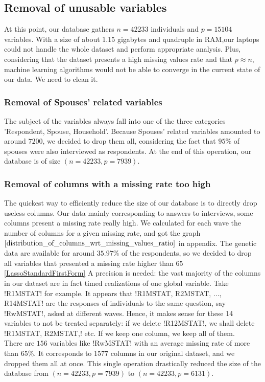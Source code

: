 \documentclass[]{article}
\begin{document}
\subsection{Removal of unusable variables}
\label{removal_of_unusable_variables}
At this point, our database gathers $n=42233$ individuals and $p=15104$ variables. With a size of about $1.15$ gigabytes and quadruple in RAM,our laptops could not handle the whole dataset and perform appropriate analysis. Plus, considering that the dataset presents a high missing values rate and that $p\approx n$, machine learning algorithms would not be able to converge in the current state of our data. We need to clean it.

\subsubsection{Removal of Spouses' related variables}
The subject of the variables always fall into one of the three categories 'Respondent, Spouse, Household'. Because Spouses' related variables amounted to around $7200$, we decided to drop them all, considering the fact that $95$\% of spouses were also interviewed as respondents.
At the end of this operation, our database is of size $(n=42233, p=7939)$.

\subsubsection{Removal of columns with a missing rate too high}
The quickest way to efficiently reduce the size of our database is to directly drop useless columns. Our data mainly corresponding to answers to interviews, some columns present a missing rate really high. We calculated for each wave the number of columns for a given missing rate, and got the graph $\ref{distribution_of_columns_wrt_missing_values_ratio}$ in appendix. The genetic data are available for around $35.97$\% of the respondents, so we decided to drop all variables that presented a missing rate higher than $65$\ref{LassoStandardFirstForm}%
A precision is needed: the vast majority of the columns in our dataset are in fact timed realizations of one global variable. Take \pyth!R1MSTAT! for example. It appears that \pyth!R1MSTAT, R2MSTAT, ..., R14MSTAT! are the responses of individuals to the same question, say \pyth!RwMSTAT!, asked at different waves. Hence, it makes sense for these 14 variables to not be treated separately: if we delete \pyth!R12MSTAT!, we shall delete \pyth!R1MSTAT, R2MSTAT,! etc. If we keep one column, we keep all of them.\\
There are $156$ variables like \pyth!RwMSTAT! with an average missing rate of more than $65$\%. It corresponds to $1577$ columns in our original dataset, and we dropped them all at once. This single operation drastically reduced the size of the database from $(n = 42233, p = 7939)$ to $(n = 42233, p = 6131)$.\\
\end{document}
